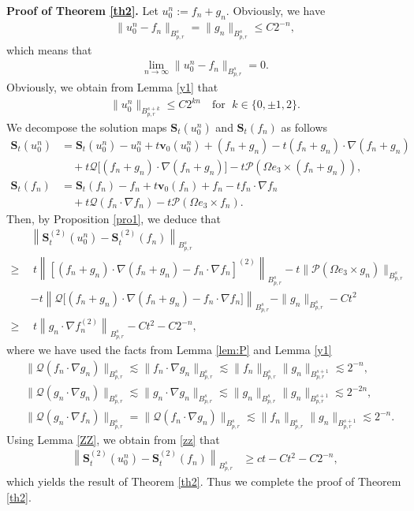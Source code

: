 \documentclass[12pt]{article}
\newcommand{\bal}{\begin{align}}
\newcommand{\bbal}{\begin{align*}}
\newcommand{\na}{\nabla}
\newcommand{\cd}{\cdot}
\newcommand{\les}{\lesssim}
\newcommand{\f}{\left}
\newcommand{\g}{\right}
\begin{document}
{\bf Proof of Theorem \ref{th2}.} Let $u^n_0:=f_n+g_n$. Obviously, we have
\bbal
\|u^n_0-f_n\|_{B^s_{p,r}}=\|g_n\|_{B^s_{p,r}}\leq C2^{-n},
\end{align*}
which means that
\bbal
\lim_{n\to\infty}\|u^n_0-f_n\|_{B^s_{p,r}}=0.
\end{align*}
Obviously, we obtain from Lemma \ref{y1} that
\bbal
\|u^n_0\|_{B^{s+k}_{p,r}}\leq C2^{kn} \quad \text{for }\; k\in\{0,\pm1,2\}.
\end{align*}
We decompose the solution maps $\mathbf{S}_{t}(u^n_0)$ and $\mathbf{S}_{t}(f_n)$ as follows
\bbal
\mathbf{S}_{t}(u^n_0)&=\mathbf{S}_{t}(u^n_0)-u^n_0+t\mathbf{v}_0(u^n_0)+(f_n+g_n)-t(f_n+g_n)\cd\na(f_n+g_n)\\
&\quad+t\mathcal{Q}\big[(f_n+g_n)\cd\na(f_n+g_n)\big]-t\mathcal{P}(\Omega e_3\times (f_n+g_n)),\\
\mathbf{S}_{t}(f_n)&=\mathbf{S}_{t}(f_n)-f_n+t\mathbf{v}_0(f_n)+f_n-tf_n\cd\na f_n\\
&\quad+t\mathcal{Q}(f_n\cd\na f_n)-t\mathcal{P}(\Omega e_3\times f_n).
\end{align*}
Then, by Proposition \ref{pro1}, we deduce that
\bal\label{zz}
&\f\|\mathbf{S}^{(2)}_{t}(u^n_0)-\mathbf{S}^{(2)}_{t}(f_n)\g\|_{B^s_{p,r}}\nonumber\\
\geq&~ t\f\|\f[(f_n+g_n)\cd\na(f_n+g_n)-f_n\cd\na f_n\g]^{(2)}\g\|_{B^s_{p,r}}-t\|\mathcal{P}(\Omega e_3\times g_n)\|_{B^s_{p,r}} \nonumber\\
\quad&-t\f\|\mathcal{Q}\big[(f_n+g_n)\cd\na(f_n+g_n)-f_n\cd\na f_n\big]\g\|_{B^s_{p,r}}-\|g_n\|_{B^s_{p,r}}-Ct^2
\nonumber\\
 \geq&~ t\f\|g_n\cd\na f_n^{(2)}\g\|_{B^s_{p,r}}-Ct^2-C2^{-n},
\end{align}
where we have used the facts from Lemma \ref{lem:P} and Lemma \ref{y1}
\bbal
&\|\mathcal{Q}(f_n\cd\na g_n)\|_{B^s_{p,r}}\les \|f_n\cd\na g_n\|_{B^s_{p,r}}\les \|f_n\|_{B^s_{p,r}}\|g_n\|_{B^{s+1}_{p,r}}\les2^{-n},\\
&\|\mathcal{Q}(g_n\cd\na g_n)\|_{B^s_{p,r}}\les\|g_n\cd\na g_n\|_{B^s_{p,r}}\les \|g_n\|_{B^s_{p,r}}\|g_n\|_{B^{s+1}_{p,r}}\les2^{-2n},\\
&\|\mathcal{Q}(g_n\cd\na f_n)\|_{B^s_{p,r}}=\|\mathcal{Q}(f_n\cd\na g_n)\|_{B^s_{p,r}}\les \|f_n\|_{B^s_{p,r}}\|g_n\|_{B^{s+1}_{p,r}}\les2^{-n}.
\end{align*}
Using Lemma \ref{ZZ}, we obtain from \eqref{zz} that
\bbal
\f\|\mathbf{S}^{(2)}_{t}(u^n_0)-\mathbf{S}^{(2)}_{t}(f_n)\g\|_{B^s_{p,r}}&\geq ct-Ct^2-C2^{-n},
\end{align*}
which yields the result of Theorem \ref{th2}. Thus we complete the proof of Theorem \ref{th2}.
\end{document}
